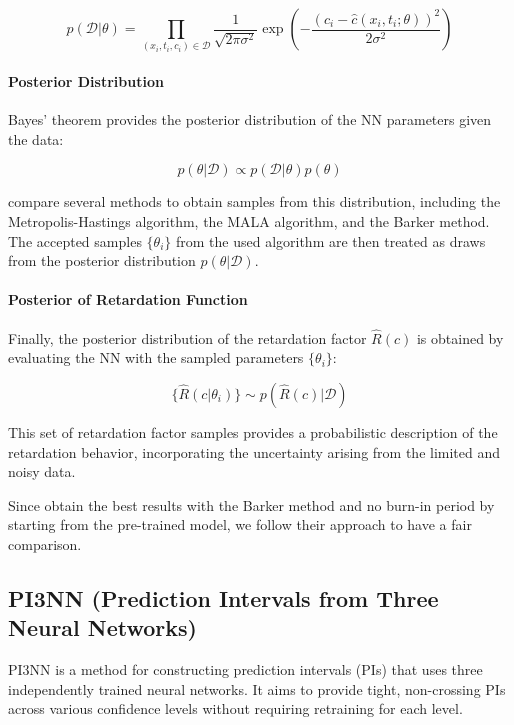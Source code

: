 \begin{equation}
p(\mathcal{D} | \theta) = \prod_{(x_i, t_i, c_i) \in \mathcal{D}} \frac{1}{\sqrt{2\pi \sigma^2}} \exp \left( -\frac{(c_i - \hat{c}(x_i, t_i; \theta))^2}{2\sigma^2} \right)
\label{eq:likelihood}
\end{equation}

\paragraph{Posterior Distribution}

Bayes' theorem provides the posterior distribution of the NN parameters given the data:

\begin{equation*}
p(\theta | \mathcal{D}) \propto p(\mathcal{D} | \theta) p(\theta)
\end{equation*}

\cite{finn} compare several methods to obtain samples from this distribution, including the Metropolis-Hastings algorithm, the MALA algorithm, and the Barker method. The accepted samples $\{\theta_i\}$ from the used algorithm are then treated as draws from the posterior distribution $p(\theta | \mathcal{D})$.

\paragraph{Posterior of Retardation Function}

Finally, the posterior distribution of the retardation factor $\hat{R}(c)$ is obtained by evaluating the NN with the sampled parameters $\{\theta_i\}$:

\begin{equation*}
\{\hat{R}(c | \theta_i)\} \sim p(\hat{R}(c) | \mathcal{D})
\end{equation*}

This set of retardation factor samples provides a probabilistic description of the retardation behavior, incorporating the uncertainty arising from the limited and noisy data.

Since \cite{finn} obtain the best results with the Barker method and no burn-in period by starting from the pre-trained model, we follow their approach to have a fair comparison.




\subsection{PI3NN (Prediction Intervals from Three Neural Networks)}
PI3NN \cite{pi3nn} is a method for constructing prediction intervals (PIs) that uses three independently trained neural networks. It aims to provide tight, non-crossing PIs across various confidence levels without requiring retraining for each level.

